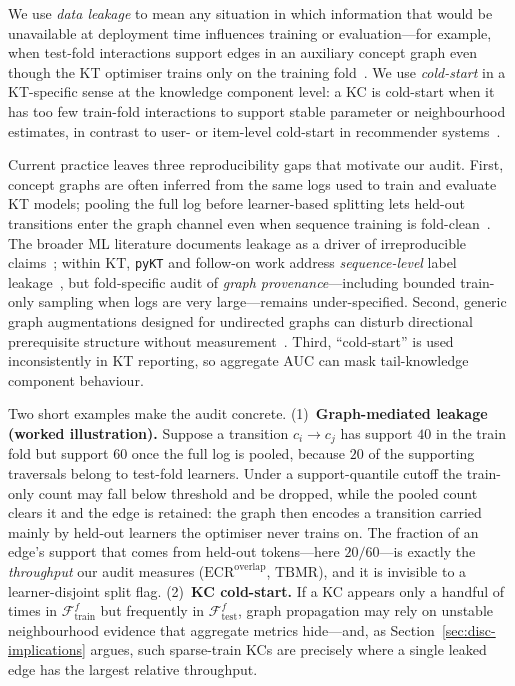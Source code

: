 \documentclass[pdflatex,sn-mathphys-num]{sn-jnl}
\newcommand{\KC}{knowledge component}
\newenvironment{revbox}{}{}
\begin{document}
We use \emph{data leakage} to mean any situation in which information
that would be unavailable at deployment time influences training or
evaluation---for example, when test-fold interactions support edges in
an auxiliary concept graph even though the KT optimiser trains only on
the training fold~\cite{kaufman2012leakage,kapoor2023leakage}. We use
\emph{cold-start} in a KT-specific sense at the \KC{} level: a KC is
cold-start when it has too few train-fold interactions to support stable
parameter or neighbourhood estimates, in contrast to user- or item-level
cold-start in recommender systems~\cite{schein2002coldstart}.

Current practice leaves three reproducibility gaps that motivate our
audit. First, concept graphs are often inferred from the same logs used
to train and evaluate KT models; pooling the full log before
learner-based splitting lets held-out transitions enter the graph
channel even when sequence training is fold-clean~\cite{nakagawa2019gkt,tong2020skt,liu2022pykt}.
The broader ML literature documents leakage as a driver of irreproducible
claims~\cite{kaufman2012leakage,kapoor2023leakage}; within KT,
\texttt{pyKT} and follow-on work address \emph{sequence-level} label
leakage~\cite{liu2022pykt,badran2024labelleakage}, but fold-specific
audit of \emph{graph provenance}---including bounded train-only sampling
when logs are very large---remains under-specified. Second, generic graph
augmentations designed for undirected graphs can disturb directional
prerequisite structure without measurement~\cite{you2020graphcl,zhu2021gca}.
Third, ``cold-start'' is used inconsistently in KT reporting, so
aggregate AUC can mask tail-\KC{} behaviour.

\begin{revbox}
Two short examples make the audit concrete. (1)~\textbf{Graph-mediated
leakage (worked illustration).} Suppose a transition $c_i\!\to\!c_j$ has
support $40$ in the train fold but support $60$ once the full log is pooled,
because $20$ of the supporting traversals belong to test-fold learners. Under
a support-quantile cutoff the train-only count may fall below threshold and be
dropped, while the pooled count clears it and the edge is retained: the graph
then encodes a transition carried mainly by held-out learners the optimiser
never trains on. The fraction of an edge's support that comes from held-out
tokens---here $20/60$---is exactly the \emph{throughput} our audit measures
($\mathrm{ECR}^{\mathrm{overlap}}$, $\mathrm{TBMR}$), and it is invisible to a
learner-disjoint split flag. (2)~\textbf{KC cold-start.} If a KC appears only a
handful of times in $\mathcal{F}_{\text{train}}^f$ but frequently in
$\mathcal{F}_{\text{test}}^f$, graph propagation may rely on unstable
neighbourhood evidence that aggregate metrics hide---and, as
Section~\ref{sec:disc-implications} argues, such sparse-train KCs are precisely
where a single leaked edge has the largest relative throughput.
\end{revbox}
\end{document}
